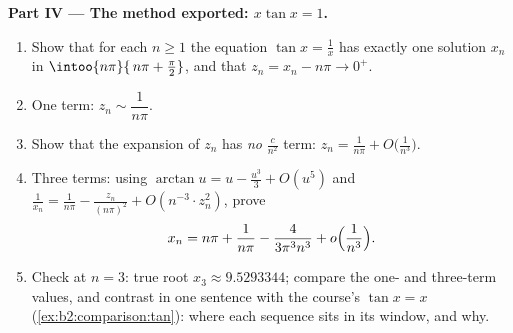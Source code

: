 \begin{problem}
\medskip
\noindent\textbf{Part IV --- The method exported: $x\tan x =
1$.}
\begin{enumerate}[resume]
  \item Show that for each $n \geq 1$ the equation $\tan x =
        \frac1x$ has exactly one solution $x_n$ in
        $\intoo{n\pi}{\,n\pi + \frac\pi2}$, and that $z_n = x_n
        - n\pi \to 0^+$.
  \item One term: $z_n \sim \dfrac{1}{n\pi}$.
  \item Show that the expansion of $z_n$ has \emph{no}
        $\frac{c}{n^2}$ term: $z_n = \frac1{n\pi} +
        O\bigl(\frac{1}{n^3}\bigr)$.
  \item Three terms: using $\arctan u = u - \frac{u^3}3 +
        O(u^5)$ and $\frac1{x_n} = \frac{1}{n\pi} -
        \frac{z_n}{(n\pi)^2} + O(n^{-3}\cdot z_n^2)$, prove
        \[
        x_n = n\pi + \frac{1}{n\pi} -
        \frac{4}{3\pi^3 n^3} + o\Bigl(\frac{1}{n^3}\Bigr).
        \]
  \item Check at $n = 3$: true root $x_3 \approx 9.5293344$;
        compare the one- and three-term values, and contrast in
        one sentence with the course's $\tan x = x$
        (\cref{ex:b2:comparison:tan}): where each sequence sits
        in its window, and why.
\end{enumerate}


\end{problem}
